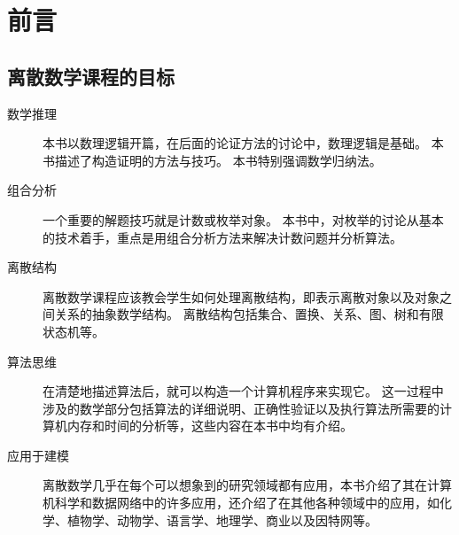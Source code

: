 \chapter{前言}
{
    \section{离散数学课程的目标}
    {
        \begin{description}
            \item[数学推理]
            {
                本书以数理逻辑开篇，在后面的论证方法的讨论中，数理逻辑是基础。
                本书描述了构造证明的方法与技巧。
                本书特别强调数学归纳法。
            }
            \item[组合分析]
            {
                一个重要的解题技巧就是计数或枚举对象。
                本书中，对枚举的讨论从基本的技术着手，重点是用组合分析方法来解决计数问题并分析算法。
            }
            \item[离散结构]
            {
                离散数学课程应该教会学生如何处理离散结构，即表示离散对象以及对象之间关系的抽象数学结构。
                离散结构包括集合、置换、关系、图、树和有限状态机等。
            }
            \item[算法思维]
            {
                在清楚地描述算法后，就可以构造一个计算机程序来实现它。
                这一过程中涉及的数学部分包括算法的详细说明、正确性验证以及执行算法所需要的计算机内存和时间的分析等，这些内容在本书中均有介绍。
            }
            \item[应用于建模]
            {
                离散数学几乎在每个可以想象到的研究领域都有应用，本书介绍了其在计算机科学和数据网络中的许多应用，还介绍了在其他各种领域中的应用，如化学、植物学、动物学、语言学、地理学、商业以及因特网等。
            }
        \end{description}
    }
}

\cleardoublepage

\endinput
